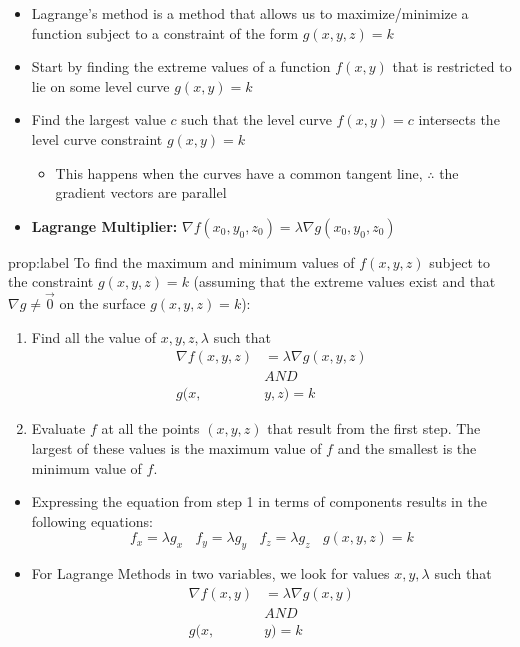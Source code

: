 \documentclass{package/notes}
\begin{document}
\begin{itemize}
	\item Lagrange's method is a method that allows us to maximize/minimize a function subject to a constraint of the form $g(x,y,z) = k$
	\item Start by finding the extreme values of a function $f(x,y)$ that is restricted to lie on some level curve $g(x,y) = k$
	\item Find the largest value $c$ such that the level curve $f(x,y) = c$ intersects the level curve constraint $g(x,y) = k$
	\begin{itemize}
		\item This happens when the curves have a common tangent line, $\therefore$ the gradient vectors are parallel
	\end{itemize}
	\item \textbf{Lagrange Multiplier:} $\nabla f(x_0,y_0,z_0)=\lambda \nabla g(x_0,y_0,z_0)$
\end{itemize}

\begin{proposition}{prop:label}
	To find the maximum and minimum values of $f(x,y,z)$ subject to the constraint $g(x,y,z) = k$ (assuming that the extreme values exist and that $\nabla g \ne \vec 0$ on the surface $g(x,y,z) = k$):

	\begin{enumerate}
		\item Find all the value of $x,y,z,\lambda$ such that
		$$
		\begin{aligned}
			\nabla f(x,y,z) &= \lambda \nabla g(x,y,z)\\
			&AND\\
			g(x,&y,z)=k
		\end{aligned}
		$$
		\item Evaluate $f$ at all the points $(x,y,z)$ that result from the first step. The largest of these values is the maximum value of $f$ and the smallest is the minimum value of $f$.
	\end{enumerate}
\end{proposition}

\begin{itemize}
	\item Expressing the equation from step 1 in terms of components results in the following equations:
	$$f_x = \lambda g_x\:\:\:\:f_y=\lambda g_y\:\:\:\:f_z=\lambda g_z\:\:\:\:g(x,y,z)=k$$
	\item For Lagrange Methods in two variables, we look for values $x,y,\lambda$ such that
	$$\begin{aligned}\nabla f(x,y) &= \lambda \nabla g(x,y)\\
	&AND\\g(x,&y) = k\end{aligned}$$
\end{itemize}
\end{document}
